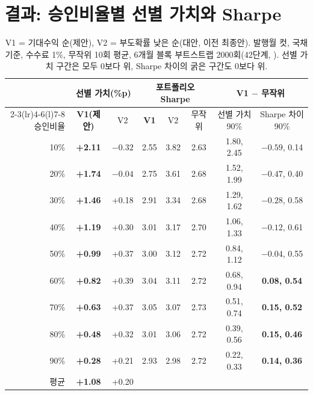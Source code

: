 \section*{결과: 승인비율별 선별 가치와 Sharpe}
\begin{table}[H]\centering\small
\begin{tabular}{@{}rccccccc@{}}\toprule
 & \multicolumn{2}{c}{선별 가치(\%p)} & \multicolumn{3}{c}{포트폴리오 Sharpe} & \multicolumn{2}{c}{V1 $-$ 무작위}\\\cmidrule(lr){2-3}\cmidrule(lr){4-6}\cmidrule(l){7-8}
승인비율 & \textbf{V1(제안)} & V2 & \textbf{V1} & V2 & 무작위 & 선별 가치 90\% & Sharpe 차이 90\%\\\midrule
10\% & \textbf{+2.11} & $-0.32$ & 2.55 & 3.82 & 2.63 & 1.80, 2.45 & $-0.59$, 0.14\\
20\% & \textbf{+1.74} & $-0.04$ & 2.75 & 3.61 & 2.68 & 1.52, 1.99 & $-0.47$, 0.40\\
30\% & \textbf{+1.46} & +0.18 & 2.91 & 3.34 & 2.68 & 1.29, 1.62 & $-0.28$, 0.58\\
40\% & \textbf{+1.19} & +0.30 & 3.01 & 3.17 & 2.70 & 1.06, 1.33 & $-0.12$, 0.61\\
50\% & \textbf{+0.99} & +0.37 & 3.00 & 3.12 & 2.72 & 0.84, 1.12 & $-0.04$, 0.55\\
60\% & \textbf{+0.82} & +0.39 & 3.04 & 3.11 & 2.72 & 0.68, 0.94 & \textbf{0.08, 0.54}\\
70\% & \textbf{+0.63} & +0.37 & 3.05 & 3.07 & 2.73 & 0.51, 0.74 & \textbf{0.15, 0.52}\\
80\% & \textbf{+0.48} & +0.32 & 3.01 & 3.06 & 2.72 & 0.39, 0.56 & \textbf{0.15, 0.46}\\
90\% & \textbf{+0.28} & +0.21 & 2.93 & 2.98 & 2.72 & 0.22, 0.33 & \textbf{0.14, 0.36}\\\midrule
평균 & \textbf{+1.08} & +0.20 & & & & & \\\bottomrule
\end{tabular}
\caption{V1 = 기대수익 순(제안), V2 = 부도확률 낮은 순(대안, 이전 최종안). 발행월 컷, 국채 기준, 수수료 1\%, 무작위 10회 평균, 6개월 블록 부트스트랩 2000회(42단계, ). 선별 가치 구간은 모두 0보다 위, Sharpe 차이의 굵은 구간도 0보다 위.}
\end{table}

